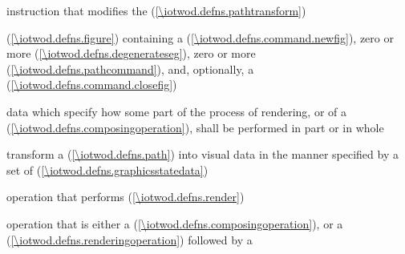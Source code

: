%
instruction that modifies the  (\ref{\iotwod.defns.pathtransform})

%
 (\ref{\iotwod.defns.figure}) containing a  (\ref{\iotwod.defns.command.newfig}), zero or more  (\ref{\iotwod.defns.degenerateseg}), zero or more  (\ref{\iotwod.defns.pathcommand}), and, optionally, a  (\ref{\iotwod.defns.command.closefig})

%
data which specify how some part of the process of rendering, or of a  (\ref{\iotwod.defns.composingoperation}), shall be performed in part or in whole

%
transform a  (\ref{\iotwod.defns.path}) into visual data in the manner specified by a set of  (\ref{\iotwod.defns.graphicsstatedata})

%
operation that performs  (\ref{\iotwod.defns.render})

%
operation that is either a  (\ref{\iotwod.defns.composingoperation}), or a  (\ref{\iotwod.defns.renderingoperation}) followed by a 

%

%
%


